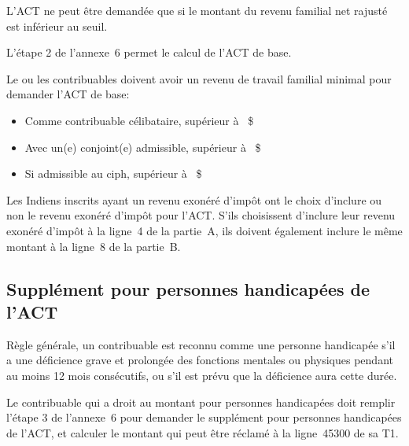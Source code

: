L'ACT ne peut être demandée que si le montant du revenu familial net rajusté est inférieur au seuil.

L'étape 2 de l'annexe~6 permet le calcul de l'ACT de base.

Le ou les contribuables doivent avoir un revenu de travail familial minimal pour demander l'ACT de base:
\begin{itemize}
	\item Comme contribuable célibataire, supérieur à ~\$
	\item Avec un(e) conjoint(e) admissible, supérieur à ~\$
	\item Si admissible au \acrshort{ciph}, supérieur à ~\$
\end{itemize}

\begin{note}
	Les Indiens inscrits ayant un revenu exonéré d'impôt ont le choix d'inclure ou non le revenu exonéré d'impôt pour l'ACT. S'ils choisissent d'inclure leur revenu exonéré d'impôt à la ligne~4 de la partie~A, ils doivent également inclure le même montant à la ligne~8 de la partie~B.
\end{note}


\subsection{Supplément pour personnes handicapées de l'ACT}
Règle générale, un contribuable est reconnu comme une personne handicapée s'il a une déficience grave et prolongée des fonctions mentales ou physiques pendant au moins 12 mois consécutifs, ou s'il est prévu que la déficience aura cette durée.

Le contribuable qui a droit au montant pour personnes handicapées doit remplir l'étape 3 de l'annexe~6 pour demander le supplément pour personnes handicapées de l'ACT, et calculer le montant qui peut être réclamé à la ligne~45300 de sa T1. 



